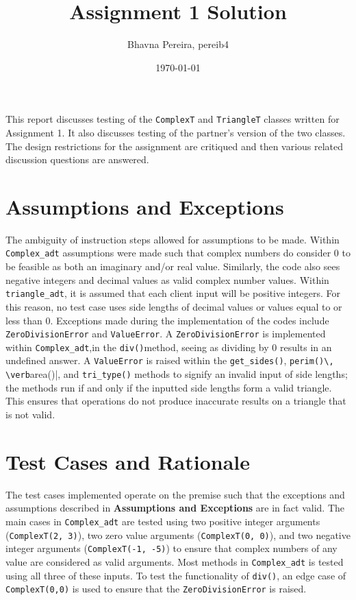 \documentclass[12pt]{article}
\title{Assignment 1 Solution}
\author{Bhavna Pereira, pereib4}
\date{\today}
\begin{document}
\maketitle

This report discusses testing of the \verb|ComplexT| and \verb|TriangleT|
classes written for Assignment 1. It also discusses testing of the partner's
version of the two classes. The design restrictions for the assignment
are critiqued and then various related discussion questions are answered.

\section{Assumptions and Exceptions} \label{AssumptAndExcept}

The ambiguity of instruction steps allowed for assumptions to be made. Within \verb|Complex_adt| assumptions were made such that complex numbers do consider 0 to be feasible as both an imaginary and/or real value. Similarly, the code also sees negative integers and decimal values as valid complex number values. Within \verb|triangle_adt|, it is assumed that each client input will be positive integers. For this reason, no test case uses side lengths of decimal values or values equal to or less than 0. Exceptions made during the implementation of the codes include \verb|ZeroDivisionError| and \verb|ValueError|. A \verb|ZeroDivisionError| is implemented within \verb|Complex_adt|,in the \verb|div()|method, seeing as dividing by 0 results in an undefined answer. A \verb|ValueError| is raised within the \verb|get_sides()|, \verb|perim()\, \verb|area()|, and \verb|tri_type()| methods to signify an invalid input of side lengths; the methods run if and only if the inputted side lengths form a valid triangle. This ensures that operations do not produce inaccurate results on a triangle that is not valid. 


\section{Test Cases and Rationale} \label{Testing}

The test cases implemented operate on the premise such that the exceptions and assumptions described in \textbf{Assumptions and Exceptions} are in fact valid. The main cases in \verb|Complex_adt| are tested using two positive integer arguments (\verb|ComplexT(2, 3)|), two zero value arguments (\verb|ComplexT(0, 0)|), and two negative integer arguments (\verb|ComplexT(-1, -5)|) to ensure that complex numbers of any value are considered as valid arguments. Most methods in \verb|Complex_adt| is tested using all three of these inputs. To test the functionality of \verb|div()|, an edge case of \verb|ComplexT(0,0)| is used to ensure that the \verb|ZeroDivisionError| is raised.
\end{document}

